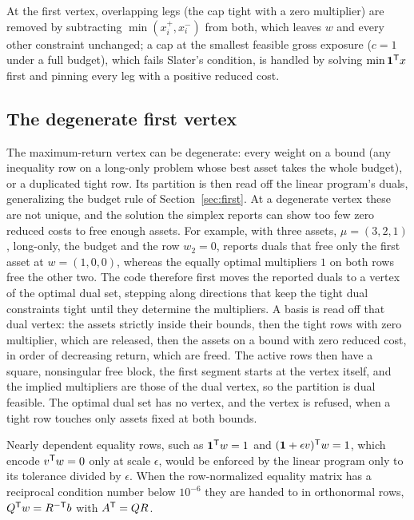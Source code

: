 At the first vertex, overlapping legs (the cap tight with a zero multiplier) are removed
by subtracting $\min(x_i^+, x_i^-)$ from both, which leaves $w$ and every other
constraint unchanged; a cap at the smallest feasible gross exposure ($c = 1$ under a
full budget), which fails Slater's condition, is handled by solving
$\min \mathbf{1}^{\mathsf{T}} x$ first and pinning every leg with a positive reduced cost.

\subsection{The degenerate first vertex}
\label{sec:vertexdetail}

The maximum-return vertex can be degenerate: every weight on a bound (any inequality row on a
long-only problem whose best asset takes the whole budget), or a duplicated tight row.
Its partition is then read off the linear program's duals, generalizing the budget rule
of Section~\ref{sec:first}. At a degenerate vertex these are not unique, and the solution the simplex
reports can show too few zero reduced costs to free enough assets. For example, with
three assets, $\mu = (3, 2, 1)$, long-only, the budget and the row $w_2 = 0$, 
reports duals that free only the first asset at $w = (1, 0, 0)$, whereas the equally
optimal multipliers $1$ on both rows free the other two. The code therefore first moves
the reported duals to a vertex of the optimal dual set, stepping along directions that
keep the tight dual constraints tight until they determine the multipliers. A basis is
read off that dual vertex: the assets strictly inside their bounds, then the tight rows
with zero multiplier, which are released, then the assets on a bound with zero reduced
cost, in order of decreasing return, which are freed. The active rows then have a square,
nonsingular free block, the first segment starts at the vertex itself, and the implied
multipliers are those of the dual vertex, so the partition is dual feasible. The optimal
dual set has no vertex, and the vertex is refused, when a tight row touches only assets
fixed at both bounds.

Nearly dependent equality rows, such as $\mathbf{1}^{\mathsf{T}} w = 1$ and
$(\mathbf{1} + \epsilon v)^{\mathsf{T}} w = 1$, which encode $v^{\mathsf{T}} w = 0$ only at scale
$\epsilon$, would be enforced by the linear program only to its tolerance divided by
$\epsilon$. When the row-normalized equality matrix has a reciprocal condition number
below $10^{-6}$ they are handed to  in orthonormal rows, $Q^{\mathsf{T}} w = R^{-\mathsf{T}}
b$ with $A^{\mathsf{T}} = QR$.
